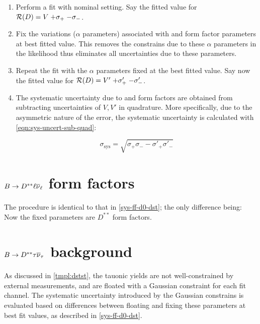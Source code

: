 \begin{enumerate}
    \item Perform a fit with nominal setting. Say the fitted value for
        $\mathcal{R}(D) = V\;{+\sigma_+}\;{-\sigma_-}$.
    \item Fix the variations ($\alpha$ parameters) associated with \Dz and
        \Dstar form factor parameters at best fitted value.
        This removes the constrains due to these $\alpha$ parameters in the
        likelihood thus
        eliminates all uncertainties due to these parameters.
    \item Repeat the fit with the $\alpha$ parameters fixed at the best fitted
        value.
        Say now the fitted value for
        $\mathcal{R}(D) = V'\;{+\sigma'_+}\;{-\sigma'_-}$.
    \item The systematic uncertainty due to \Dz and \Dstar form factors are
        obtained from subtracting uncertainties of $V, V'$ in quadrature.
        More specifically, due to the asymmetric nature of the error,
        the systematic uncertainty is calculated with
        \cref{eqn:sys-uncert-sub-quad}:

        \begin{equation}
            \sigma_\text{sys} = \sqrt{\sigma_+ \sigma_- - \sigma'_+ \sigma'_-}
            \label{eqn:sys-uncert-sub-quad}
        \end{equation}
\end{enumerate}


\section{$B \rightarrow D^{**}\ell{\ensuremath{{\overline{\nu}}_\ell}}$ form factors}
\label{sys-ff-dstst}

The procedure is identical to that in \cref{sys-ff-d0-dst}; the only difference
being: Now the fixed parameters are $D^{**}$ form factors.


\section{$B \rightarrow D^{**}\tau{\ensuremath{{\overline{\nu}}_\tau}}$ background}
\label{sys-tau-dstst}

As discussed in \cref{tmpl:dstst},
the tauonic yields are not well-constrained by external measurements, and
are floated with a Gaussian constraint for each fit channel.
The systematic uncertainty introduced by the Gaussian constrains
is evaluated based on differences between floating and fixing these parameters
at best fit values, as described in \cref{sys-ff-d0-dst}.


